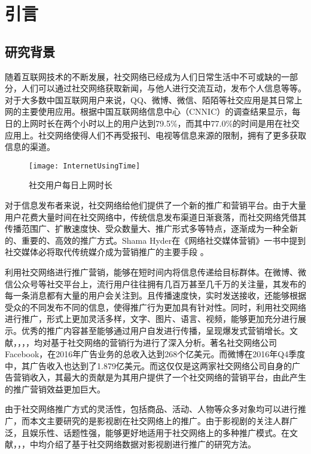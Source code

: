\chapter{引言}


\section{研究背景}

随着互联网技术的不断发展，社交网络已经成为人们日常生活中不可或缺的一部分，人们可以通过社交网络获取新闻，与他人进行交流互动，发布个人信息等等。对于大多数中国互联网用户来说，QQ、微博、微信、陌陌等社交应用是其日常上网的主要使用应用。根据中国互联网络信息中心（CNNIC）的调查结果显示\cite{internetSurvey}，每日的上网时长在两个小时以上的用户达到79.5\%，而其中77.0\%的时间是用在社交应用上。社交网络使得人们不再受报刊、电视等信息来源的限制，拥有了更多获取信息的渠道。

\begin{figure}[h] 
  \centering
  \texttt{[image: InternetUsingTime]}
  \caption{社交用户每日上网时长}
  \label{InternetUsingTime}
\end{figure}

对于信息发布者来说，社交网络给他们提供了一个新的推广和营销平台。由于大量用户花费大量时间在社交网络中，传统信息发布渠道日渐衰落，而社交网络凭借其传播范围广、扩散速度快、受众数量大、推广形式多等特点，逐渐成为一种全新的、重要的、高效的推广方式。Shama Hyder在《网络社交媒体营销》一书中提到社交媒体必将取代传统媒介成为营销推广的主要手段 \cite{hyder2016zen}。

利用社交网络进行推广营销，能够在短时间内将信息传递给目标群体。在微博、微信公众号等社交平台上，流行用户往往拥有几百万甚至几千万的关注量，其发布的每一条消息都有大量的用户会关注到。且传播速度快，实时发送接收，还能够根据受众的不同发布不同的信息，使得推广行为更加具有针对性。同时，利用社交网络进行推广，形式上更加灵活多样，文字、图片、语言、视频，能够更加充分进行展示。优秀的推广内容甚至能够通过用户自发进行传播，呈现爆发式营销增长。文献\cite{tuten2014social}，\cite{saravanakumar2012social}，\cite{heymann2012social}，\cite{zavivsic2011social}，\cite{bolotaeva2010marketing}均对基于社交网络的营销行为进行了深入分析。著名社交网络公司Facebook，在2016年广告业务的总收入达到268个亿美元\cite{Facebook}。而微博在2016年Q4季度中，其广告收入也达到了1.879亿美元\cite{微博}。而这仅仅是这两家社交网络公司自身的广告营销收入，其最大的贡献是为其用户提供了一个社交网络的营销平台，由此产生的推广营销效益更加巨大。

由于社交网络推广方式的灵活性，包括商品、活动、人物等众多对象均可以进行推广，而本文主要研究的是影视剧在社交网络上的推广。由于影视剧的关注人群广泛，且娱乐性、话题性强，能够更好地适用于社交网络上的多种推广模式。在文献\cite{张琦2011新媒介环境下的中国电影营销策略研究}，\cite{于瑞华2012基于}，\cite{ono2007context}，\cite{golbeck2006filmtrust}中均介绍了基于社交网络数据对影视剧进行推广的研究方法。

